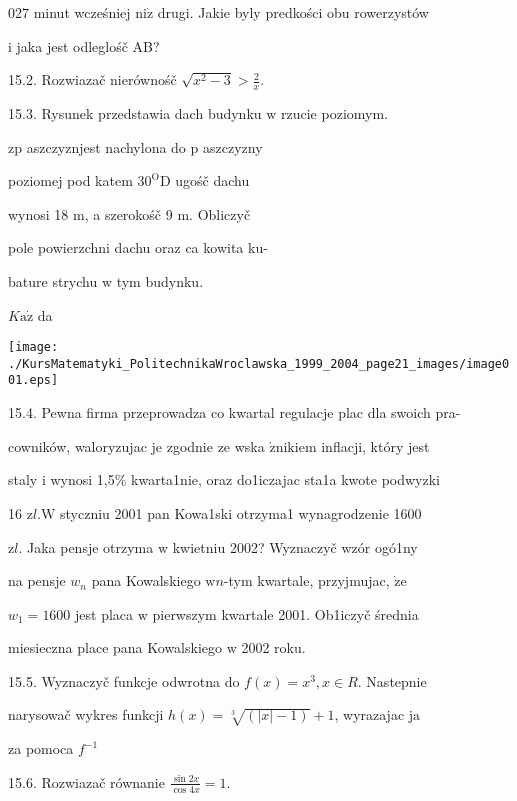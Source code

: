 \documentclass[a4paper,12pt]{article}
\begin{document}
$027$ minut wcześniej $\mathrm{n}\mathrm{i}\dot{\mathrm{z}}$ drugi. Jakie byly predkości obu rowerzystów

$\mathrm{i}$ jaka jest odleglośč AB?

15.2. Rozwiazač nierównośč $\displaystyle \sqrt{x^{2}-3}>\frac{2}{x}.$

15.3. Rysunek przedstawia dach budynku $\mathrm{w}$ rzucie poziomym.

$\mathrm{z}\mathrm{p}$ aszczyznjest nachylona do $\mathrm{p}$ aszczyzny

poziomej pod katem $30^{\mathrm{O}} \mathrm{D}$ ugośč dachu

wynosi 18 $\mathrm{m}$, a szerokośč 9 $\mathrm{m}$. Obliczyč

pole powierzchni dachu oraz ca kowita ku-

bature strychu $\mathrm{w}$ tym budynku.

$K\mathrm{a}\dot{\mathrm{z}}$ da
\begin{center}
\texttt{[image: ./KursMatematyki\_PolitechnikaWroclawska\_1999\_2004\_page21\_images/image001.eps]}
\end{center}
15.4. Pewna firma przeprowadza co kwartal regulacje plac dla swoich pra-

cowników, waloryzujac je zgodnie ze wska $\acute{\mathrm{z}}\mathrm{n}\mathrm{i}\mathrm{k}\mathrm{i}\mathrm{e}\mathrm{m}$ inflacji, który jest

staly $\mathrm{i}$ wynosi 1,5\% kwarta1nie, oraz do1iczajac sta1a kwote podwyzki

16 $\mathrm{z}l. \mathrm{W}$ styczniu 2001 pan Kowa1ski otrzyma1 wynagrodzenie 1600

$\mathrm{z}l$. Jaka pensje otrzyma $\mathrm{w}$ kwietniu 2002? Wyznaczyč wzór ogó1ny

na pensje $w_{n}$ pana Kowalskiego $\mathrm{w}n$-tym kwartale, przyjmujac, $\dot{\mathrm{z}}\mathrm{e}$

$w_{1}=1600$ jest placa $\mathrm{w}$ pierwszym kwartale 2001. Ob1iczyč średnia

miesieczna place pana Kowalskiego $\mathrm{w}$ 2002 roku.

15.5. Wyznaczyč funkcje odwrotna do $f(x) = x^{3}, x \in R$. Nastepnie

narysowač wykres funkcji $h(x) = \sqrt[3]{(|x|-1)}+1$, wyrazajac $\mathrm{j}\mathrm{a}$

za pomoca $f^{-1}$

15.6. Rozwiazač równanie $\displaystyle \frac{\sin 2x}{\cos 4x}=1.$
\end{document}
